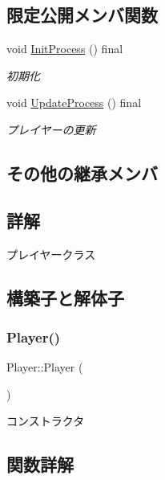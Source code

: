 \subsection*{限定公開メンバ関数}
\begin{DoxyCompactItemize}
\item 
void \mbox{\hyperlink{class_player_a1051f85c8bf18a256d275d1a1dee5da6}{Init\+Process}} () final
\begin{DoxyCompactList}\small\item\em 初期化 \end{DoxyCompactList}\item 
void \mbox{\hyperlink{class_player_ab8accc9b83b030f5313f1b4872a7e634}{Update\+Process}} () final
\begin{DoxyCompactList}\small\item\em プレイヤーの更新 \end{DoxyCompactList}\end{DoxyCompactItemize}
\subsection*{その他の継承メンバ}


\subsection{詳解}
プレイヤークラス 

\subsection{構築子と解体子}
\mbox{\label{class_player_affe0cc3cb714f6deb4e62f0c0d3f1fd8}} 
\subsubsection{\texorpdfstring{Player()}{Player()}}
{\footnotesize\ttfamily Player\+::\+Player (\begin{DoxyParamCaption}{ }\end{DoxyParamCaption})\hspace{0.3cm}{\ttfamily [inline]}}



コンストラクタ 



\subsection{関数詳解}
\mbox{\label{class_player_a184fbb2c70e34fb6c6a0c2fc7e0f86c9}} 
